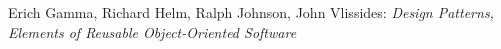 \documentclass[../thesis.tex]{subfiles}
\begin{document}
\begin{thebibliography}{99}

Erich Gamma, Richard Helm, Ralph Johnson, John Vlissides:
\emph{Design Patterns, Elements of Reusable Object-Oriented Software}
				
\end{thebibliography}
\end{document}

